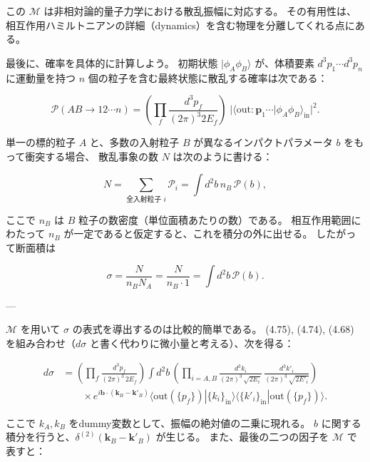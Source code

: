 \documentclass[a4paper,12pt]{article}
\begin{document}
この $\mathcal{M}$ は非相対論的量子力学における散乱振幅に対応する。  
その有用性は、相互作用ハミルトニアンの詳細（dynamics）を含む物理を分離してくれる点にある。  


最後に、確率を具体的に計算しよう。  
初期状態 $|\phi_A \phi_B\rangle$ が、体積要素 $d^3p_1 \cdots d^3p_n$ に運動量を持つ $n$ 個の粒子を含む最終状態に散乱する確率は次である：

\begin{equation}
\mathcal{P}(AB \to 1 2 \cdots n) 
= \left( \prod_f \frac{d^3p_f}{(2\pi)^3 2E_f} \right)
\; \big| \langle \text{out} : \mathbf{p}_1 \cdots | \phi_A \phi_B \rangle_{\text{in}} \big|^2.
\tag{4.74}
\end{equation}

単一の標的粒子 $A$ と、多数の入射粒子 $B$ が異なるインパクトパラメータ $b$ をもって衝突する場合、  
散乱事象の数 $N$ は次のように書ける：

\begin{equation}
N = \sum_{\text{全入射粒子 } i} \mathcal{P}_i 
= \int d^2 b \, n_B \, \mathcal{P}(b),
\end{equation}

ここで $n_B$ は $B$ 粒子の数密度（単位面積あたりの数）である。  
相互作用範囲にわたって $n_B$ が一定であると仮定すると、これを積分の外に出せる。  
したがって断面積は

\begin{equation}
\sigma = \frac{N}{n_B N_A} = \frac{N}{n_B \cdot 1}
= \int d^2 b \, \mathcal{P}(b).
\tag{4.75}
\end{equation}

---

$\mathcal{M}$ を用いて $\sigma$ の表式を導出するのは比較的簡単である。  
(4.75), (4.74), (4.68) を組み合わせ（$d\sigma$ と書く代わりに微小量と考える）、次を得る：

\begin{align}
d\sigma &= 
\left( \prod_f \frac{d^3p_f}{(2\pi)^3 \, 2E_f}\right)
\int d^2b \,
\left( \prod_{i=A,B} \frac{d^3k_i}{(2\pi)^3 \, \sqrt{2E_i}} \, \frac{d^3k'_i}{(2\pi)^3 \, \sqrt{2E'_i}} \right) \nonumber \\
&\qquad \times e^{i\mathbf{b}\cdot(\mathbf{k}_B - \mathbf{k}'_B)} 
\langle \text{out}(\{p_f\}) | \{k_i\}_{\text{in}} \rangle
\langle \{k'_i\}_{\text{in}} | \text{out}(\{p_f\}) \rangle.
\tag{4.76}
\end{align}

ここで $k_A, k_B$ をdummy変数として、振幅の絶対値の二乗に現れる。  
$b$ に関する積分を行うと、$\delta^{(2)}(\mathbf{k}_B - \mathbf{k}'_B)$ が生じる。  
また、最後の二つの因子を $\mathcal{M}$ で表すと：
\end{document}
